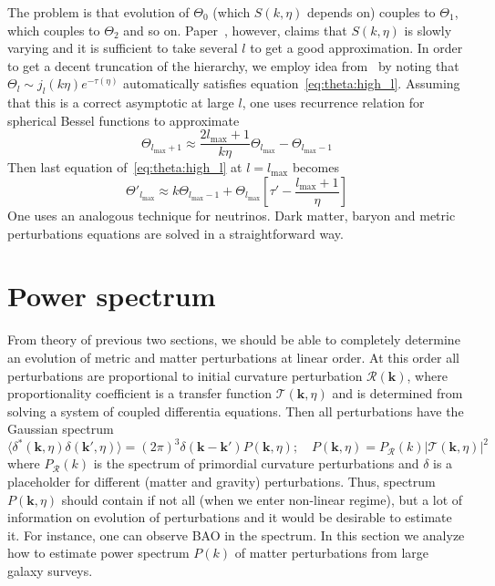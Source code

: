 \documentclass[12pt]{extarticle}
\numberwithin{problem}{section}
\numberwithin{theorem}{section}
\begin{document}
	The problem is that evolution of $\Theta_0$ (which $S(k, \eta)$ depends on) couples to $\Theta_1$, which couples to $\Theta_2$ and so on. Paper~\cite{seljak:1996}, however, claims that $S(k, \eta)$ is slowly varying and it is sufficient to take several $l$ to get a good approximation. In order to get a decent truncation of the hierarchy, we employ idea from~\cite{ma:1995} by noting that $\Theta_l\sim j_l(k\eta)e^{-\tau(\eta)}$ automatically satisfies equation~\ref{eq:theta:high_l}. Assuming that this is a correct asymptotic at large $l$, one uses recurrence relation for spherical Bessel functions to approximate
	\begin{equation}
		\Theta_{l_{\max} + 1}\approx \frac{2l_{\max} + 1}{k\eta}\Theta_{l_{\max}} - \Theta_{l_{\max} - 1}
	\end{equation}
	Then last equation of~\ref{eq:theta:high_l} at $l = l_{\max}$ becomes
	\begin{equation}
		\Theta'_{l_{\max}}\approx k\Theta_{l_{\max} - 1} + \Theta_{l_{\max}}\left[\tau' - \frac{l_{\max} + 1}{\eta}\right]
	\end{equation}
	One uses an analogous technique for neutrinos. Dark matter, baryon and metric perturbations equations are solved in a straightforward way.
	
	\section{Power spectrum}
	\label{sec:power}
	From theory of previous two sections, we should be able to completely determine an evolution of metric and matter perturbations at linear order. At this order all perturbations are proportional to initial curvature perturbation $\mathcal{R}(\mathbf{k})$, where proportionality coefficient is a transfer function $\mathcal{T}(\mathbf{k}, \eta)$ and is determined from solving a system of coupled differentia equations. Then all perturbations have the Gaussian spectrum
	\begin{equation}
		\langle\delta^*(\mathbf{k}, \eta)\delta(\mathbf{k}', \eta)\rangle = (2\pi)^3\delta(\mathbf{k} - \mathbf{k}')P(\mathbf{k}, \eta);\quad P(\mathbf{k}, \eta) = P_{\mathcal{R}}(k)|\mathcal{T}(\mathbf{k}, \eta)|^2
	\end{equation}
	where $P_{\mathcal{R}}(k)$ is the spectrum of primordial curvature perturbations and $\delta$ is a placeholder for different (matter and gravity) perturbations. Thus, spectrum $P(\mathbf{k}, \eta)$ should contain if not all (when we enter non-linear regime), but a lot of information on evolution of perturbations and it would be desirable to estimate it. For instance, one can observe BAO in the spectrum. In this section we analyze how to estimate power spectrum $P(k)$ of matter perturbations from large galaxy surveys.
	
\end{document}
